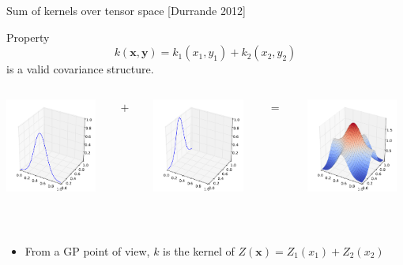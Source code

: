\documentclass{beamer}
\begin{document}
\begin{frame}{Sum of kernels over tensor space [Durrande 2012]}
\begin{block}{Property}
\begin{equation*}
k(\textbf{x},\textbf{y}) = k_1(x_1,y_1) +  k_2(x_2,y_2)
\end{equation*} is a valid covariance structure.\\
\begin{columns}[c]
\begin{column}{3cm}
\includegraphics[width=3cm]{figures/python/newfromold-sum2-k1}
\end{column}
\begin{column}{2mm}
$+$
\end{column}
\begin{column}{3cm}
\includegraphics[width=3cm]{figures/python/newfromold-sum2-k2}
\end{column}
\begin{column}{2mm}
$=$
\end{column}
\begin{column}{3cm}
\includegraphics[width=3cm]{figures/python/newfromold-sum2-k12}
\end{column}
\end{columns}
\vspace{4mm}
\end{block} \ \\
\begin{itemize}
 \item From a GP point of view, $k$ is the kernel of $Z(\textbf{x}) = Z_1(x_1) + Z_2(x_2)$
\end{itemize}
\end{frame}
\end{document}

